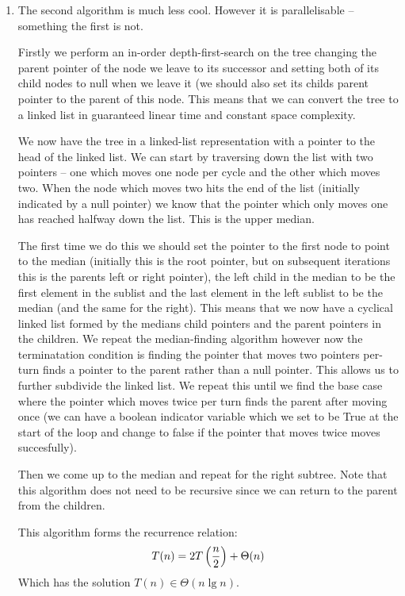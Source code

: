 \documentclass[10pt,\jkfside,a4paper]{article}
\begin{document}
\begin{enumerate}
\begin{enumerate}
\item The second algorithm is much less cool. However it is parallelisable -- something the first is not.

Firstly we perform an in-order depth-first-search on the tree changing the parent pointer of the node we leave to its 
successor and setting both of its child nodes to null when we leave it (we should also set its childs 
parent pointer to the parent of this node. This means that we can convert the tree to a linked list in guaranteed linear 
time and constant space complexity.

We now have the tree in a linked-list representation with a pointer to the head of the linked list. We can start 
by traversing down the list with two pointers -- one which moves one node per cycle and the other which moves two. 
When the node which moves two hits the end of the list (initially indicated by a null pointer) we know that the 
pointer which only moves one has reached halfway down the list. This is the upper median.

The first time we do this we should set the pointer to the first node to point to the median (initially 
this is the root pointer, but on subsequent iterations this is the parents left or right pointer), the left child in 
the median to be the first element in the sublist 
and the last element in the left sublist to be the median (and the same for the right). This means that we now have 
a cyclical linked list formed by the medians child pointers and the parent pointers in the children. We repeat the 
median-finding algorithm however now the terminatation condition is finding the pointer that moves two pointers per-turn 
finds a pointer to the parent rather than a null pointer. This allows us to further subdivide the linked list. We repeat this 
until we find the base case where the pointer which moves twice per turn finds the parent after moving once (we can have a 
boolean indicator variable which we set to be True at the start of the loop and change to false if the pointer that moves twice 
moves succesfully).

Then we come up to the median and repeat for the right subtree. Note that this algorithm does not need to be recursive 
since we can return to the parent from the children.

This algorithm forms the recurrence relation:
\begin{equation}
T(n) = 2T\left(\frac{n}{2}\right) + \Theta(n) \\
\end{equation}
Which has the solution $T(n) \in \Theta(n \lg n)$.


\end{enumerate}
\end{enumerate}
\end{document}
